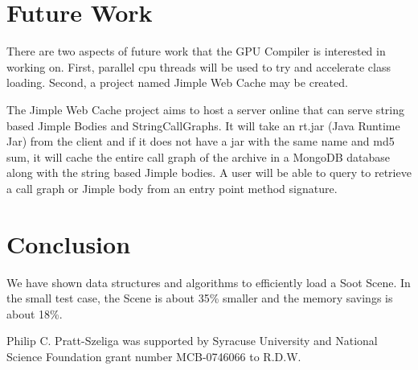 \documentclass{sigplanconf}
\begin{document}
\section{Future Work}
\label{sec:future}
There are two aspects of future work that the \rb GPU Compiler is interested in working on. First, parallel cpu threads will be used to try and accelerate class loading. Second, a project named Jimple Web Cache may be created.

The Jimple Web Cache project aims to host a server online that can serve string based Jimple Bodies and StringCallGraphs. It will take an rt.jar (Java Runtime Jar) from the client and if it does not have a jar with the same name and md5 sum, it will cache the entire call graph of the archive in a MongoDB database along with the string based Jimple bodies. A user will be able to query to retrieve a call graph or Jimple body from an entry point method signature.

\section{Conclusion}
\label{sec:conclusion}
We have shown data structures and algorithms to efficiently load a Soot Scene. In the small test case, the Scene is about 35\% smaller and the memory savings is about 18\%.

\acks
Philip C. Pratt-Szeliga was supported by Syracuse University and National Science Foundation grant number MCB-0746066 to R.D.W.









\end{document}
